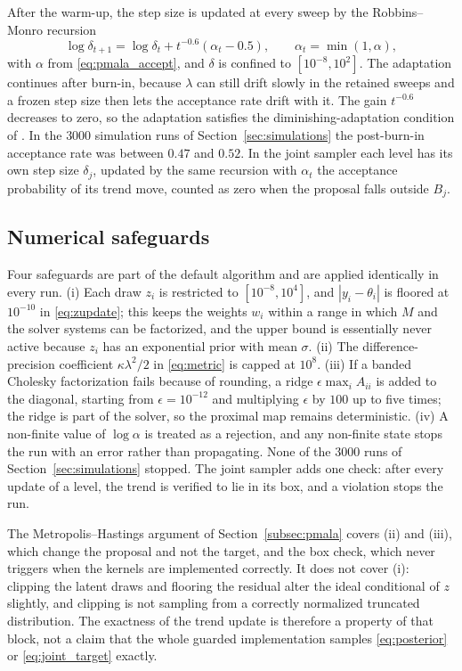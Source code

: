 After the warm-up, the step size is updated at every sweep by the Robbins--Monro recursion
\[
\log\delta_{t+1} = \log\delta_t + t^{-0.6}\left(\alpha_t - 0.5\right), \qquad \alpha_t = \min(1, \alpha),
\]
with $\alpha$ from \eqref{eq:pmala_accept}, and $\delta$ is confined to $[10^{-8}, 10^{2}]$. The adaptation continues after burn-in, because $\lambda$ can still drift slowly in the retained sweeps and a frozen step size then lets the acceptance rate drift with it. The gain $t^{-0.6}$ decreases to zero, so the adaptation satisfies the diminishing-adaptation condition of \citet{roberts2007coupling}. In the $3000$ simulation runs of Section~\ref{sec:simulations} the post-burn-in acceptance rate was between $0.47$ and $0.52$. In the joint sampler each level has its own step size $\delta_j$, updated by the same recursion with $\alpha_t$ the acceptance probability of its trend move, counted as zero when the proposal falls outside $B_j$.

\subsection{Numerical safeguards}
\label{app:pmala:safeguards}

Four safeguards are part of the default algorithm and are applied identically in every run. (i) Each draw $z_i$ is restricted to $[10^{-8}, 10^{4}]$, and $|y_i - \theta_i|$ is floored at $10^{-10}$ in \eqref{eq:zupdate}; this keeps the weights $w_i$ within a range in which $M$ and the solver systems can be factorized, and the upper bound is essentially never active because $z_i$ has an exponential prior with mean $\sigma$. (ii) The difference-precision coefficient $\kappa\lambda^2/2$ in \eqref{eq:metric} is capped at $10^{8}$. (iii) If a banded Cholesky factorization fails because of rounding, a ridge $\epsilon\max_i A_{ii}$ is added to the diagonal, starting from $\epsilon = 10^{-12}$ and multiplying $\epsilon$ by $100$ up to five times; the ridge is part of the solver, so the proximal map remains deterministic. (iv) A non-finite value of $\log\alpha$ is treated as a rejection, and any non-finite state stops the run with an error rather than propagating. None of the $3000$ runs of Section~\ref{sec:simulations} stopped. The joint sampler adds one check: after every update of a level, the trend is verified to lie in its box, and a violation stops the run.

The Metropolis--Hastings argument of Section~\ref{subsec:pmala} covers (ii) and (iii), which change the proposal and not the target, and the box check, which never triggers when the kernels are implemented correctly. It does not cover (i): clipping the latent draws and flooring the residual alter the ideal conditional of $z$ slightly, and clipping is not sampling from a correctly normalized truncated distribution. The exactness of the trend update is therefore a property of that block, not a claim that the whole guarded implementation samples \eqref{eq:posterior} or \eqref{eq:joint_target} exactly.

